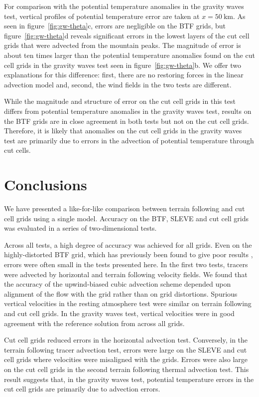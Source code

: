 \documentclass{ametsoc}
\begin{document}
For comparison with the potential temperature anomalies in the gravity waves test, vertical profiles of potential temperature error are taken at $x = \SI{50}{\kilo\meter}$.  As seen in figure~\ref{fig:gw-theta}c, errors are negligible on the BTF grids, but figure~\ref{fig:gw-theta}d reveals significant errors in the lowest layers of the cut cell grids that were advected from the mountain peaks.  The magnitude of error is about ten times larger than the potential temperature anomalies found on the cut cell grids in the gravity waves test seen in figure~\ref{fig:gw-theta}b.  We offer two explanations for this difference: first, there are no restoring forces in the linear advection model and, second, the wind fields in the two tests are different.

While the magnitude and structure of error on the cut cell grids in this test differs from potential temperature anomalies in the gravity waves test, results on the BTF grids are in close agreement in both tests but not on the cut cell grids.  Therefore, it is likely that anomalies on the cut cell grids in the gravity waves test are primarily due to errors in the advection of potential temperature through cut cells.

\section{Conclusions}
We have presented a like-for-like comparison between terrain following and cut cell grids using a single model.  Accuracy on the BTF, SLEVE and cut cell grids was evaluated in a series of two-dimensional tests.

Across all tests, a high degree of accuracy was achieved for all grids.  Even on the highly-distorted BTF grid, which has previously been found to give poor results \citep{schaer2002,klemp2011,good2014}, errors were often small in the tests presented here.  In the first two tests, tracers were advected by horizontal and terrain following velocity fields.  We found that the accuracy of the upwind-biased cubic advection scheme depended upon alignment of the flow with the grid rather than on grid distortions.
Spurious vertical velocities in the resting atmosphere test were similar on terrain following and cut cell grids.
In the gravity waves test, vertical velocities were in good agreement with the reference solution from \citet{melvin2010} across all grids.

Cut cell grids reduced errors in the horizontal advection test.  Conversely, in the terrain following tracer advection test, errors were large on the SLEVE and cut cell grids where velocities were misaligned with the grids.  Errors were also large on the cut cell grids in the second terrain following thermal advection test.  This result suggests that, in the gravity waves test, potential temperature errors in the cut cell grids are primarily due to advection errors.
\end{document}
